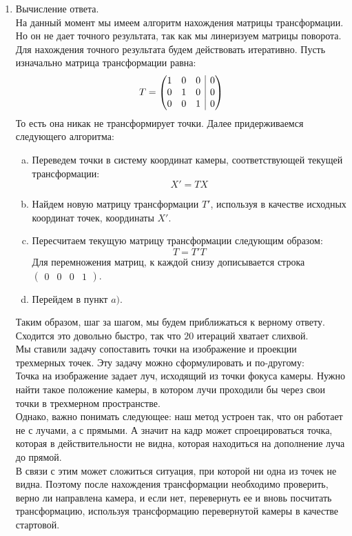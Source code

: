 \documentclass[12pt]{article}
\newenvironment{MyList}[1][4pt]{
  \begin{enumerate}[1.]
  \setlength{\parskip}{0pt}
  \setlength{\itemsep}{#1}
}{       
  \end{enumerate}
}
\newenvironment{InnerMyList}[1][0pt]{
  \vspace*{-0.5em}
  \begin{enumerate}[a)]
  \setlength{\parskip}{#1}
  \setlength{\itemsep}{0pt}
}{
  \end{enumerate}
}
\begin{document}
\begin{MyList}
		\newpage
		\item{Вычисление ответа.}\\
		На данный момент мы имеем алгоритм нахождения матрицы трансформации. Но он не дает точного результата, так как мы линеризуем матрицы поворота. Для нахождения точного результата будем действовать итеративно. Пусть изначально матрица трансформации равна:
		$$T = \left(\begin{array}{@{}ccc|c@{}}
		1 & 0 & 0 & 0 \\
		0 & 1 & 0 & 0 \\
		0 & 0 & 1 & 0
		\end{array}\right)$$
		То есть она никак не трансформирует точки. Далее придерживаемся следующего алгоритма:
		\begin{InnerMyList}
			\item
			Переведем точки в систему координат камеры, соответствующей текущей трансформации:
			$$X' = T X$$
			
			\item 
			Найдем новую матрицу трансформации $T'$, используя в качестве исходных координат точек, координаты $X'$.
			
			\item
			Пересчитаем текущую матрицу трансформации следующим образом:
			$$T = T' T$$
			Для перемножения матриц, к каждой снизу дописывается строка 
			$\begin{pmatrix} 0 & 0 & 0 & 1 \end{pmatrix}$.
			
			\item
			Перейдем в пункт $a)$.
		\end{InnerMyList}
		
		Таким образом, шаг за шагом, мы будем приближаться к верному ответу. Сходится это довольно быстро, так что $20$ итераций хватает слихвой.\\
		
		Мы ставили задачу сопоставить точки на изображение и проекции трехмерных точек. Эту задачу можно сформулировать и по-другому:\\
		Точка на изображение задает луч, исходящий из точки фокуса камеры. Нужно найти такое положение камеры, в котором лучи проходили бы через свои точки в трехмерном пространстве.\\
		Однако, важно понимать следующее: наш метод устроен так, что он работает не с лучами, а с прямыми. А значит на кадр может спроецироваться точка, которая в действительности не видна, которая находиться на дополнение луча до прямой.\\
		В связи с этим может сложиться ситуация, при которой ни одна из точек не видна. Поэтому после нахождения трансформации необходимо проверить, верно ли направлена камера, и если нет, перевернуть ее и вновь посчитать трансформацию, используя трансформацию перевернутой камеры в качестве стартовой.\\
		

\end{MyList}
\end{document}

